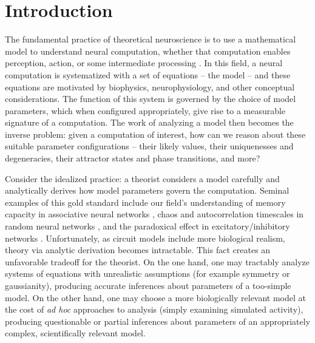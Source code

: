 \documentclass[11pt]{article}
\begin{document}
\section{Introduction}
The fundamental practice of theoretical neuroscience is to use a mathematical model to understand neural computation, whether that computation enables perception, action, or some intermediate processing \cite{abbott2008theoretical}.  
In this field, a neural computation is systematized with a set of equations -- the model -- and these equations are motivated by biophysics, neurophysiology, and other conceptual considerations.
The function of this system is governed by the choice of model parameters, which when configured appropriately, give rise to a measurable signature of a computation.   
The work of analyzing a model then becomes the inverse problem: given a computation of interest, how can we reason about these suitable parameter configurations -- their likely values, their uniquenesses and degeneracies, their attractor states and phase transitions, and more?  

Consider the idealized practice: a theorist considers a model carefully and analytically derives how model parameters govern the computation.  
Seminal examples of this gold standard include our field's understanding of memory capacity in associative neural networks \cite{hopfield1982neural}, chaos and autocorrelation timescales in random neural networks \cite{sompolinsky1988chaos}, and the paradoxical effect in excitatory/inhibitory networks \cite{tsodyks1997paradoxical}.  
Unfortunately, as circuit models include more biological realism, theory via analytic derivation becomes intractable.  
This fact creates an unfavorable tradeoff for the theorist.  On the one hand, one may tractably analyze systems of equations with unrealistic assumptions (for example symmetry or gaussianity), producing accurate inferences about parameters of a too-simple model.  On the other hand, one may choose a more biologically relevant model at the cost of \emph{ad hoc} approaches to analysis (simply examining simulated activity), producing questionable or partial inferences about parameters of an appropriately complex, scientifically relevant model.  %
\end{document}
